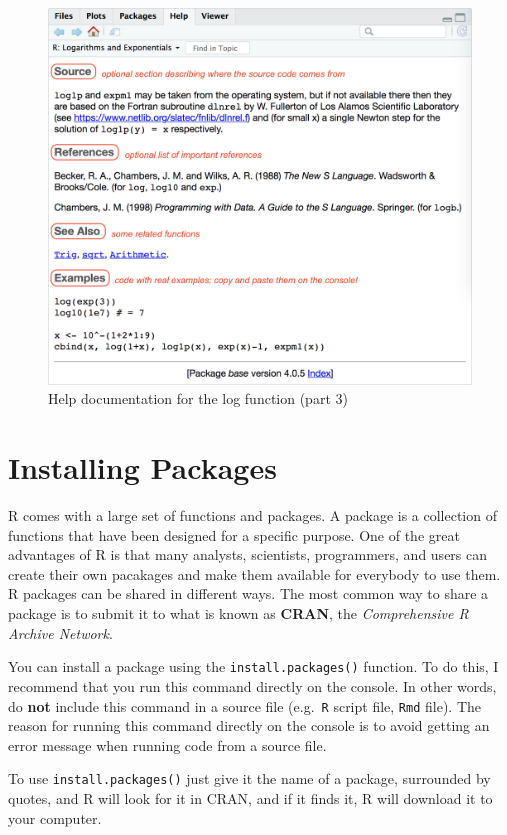 \documentclass[
]{book}
\begin{document}
\begin{figure}

{\centering \includegraphics[width=0.8\linewidth]{images/rstudio/help-log-3} 

}

\caption{Help documentation for the log function (part 3)}\label{fig:unnamed-chunk-22}
\end{figure}

\hypertarget{installing-packages}{%
\section{Installing Packages}\label{installing-packages}}

R comes with a large set of functions and packages. A package is a collection
of functions that have been designed for a specific purpose. One of the great
advantages of R is that many analysts, scientists, programmers, and users
can create their own pacakages and make them available for everybody to use them.
R packages can be shared in different ways. The most common way to share a
package is to submit it to what is known as \textbf{CRAN}, the
\emph{Comprehensive R Archive Network}.

You can install a package using the \texttt{install.packages()} function. To do this,
I recommend that you run this command directly on the console. In other words,
do \textbf{not} include this command in a source file (e.g.~\texttt{R} script file, \texttt{Rmd}
file). The reason for running this command directly on the console is to avoid
getting an error message when running code from a source file.

To use \texttt{install.packages()} just give it the name of a package, surrounded by
quotes, and R will look for it in CRAN, and if it finds it, R will download it
to your computer.
\end{document}

